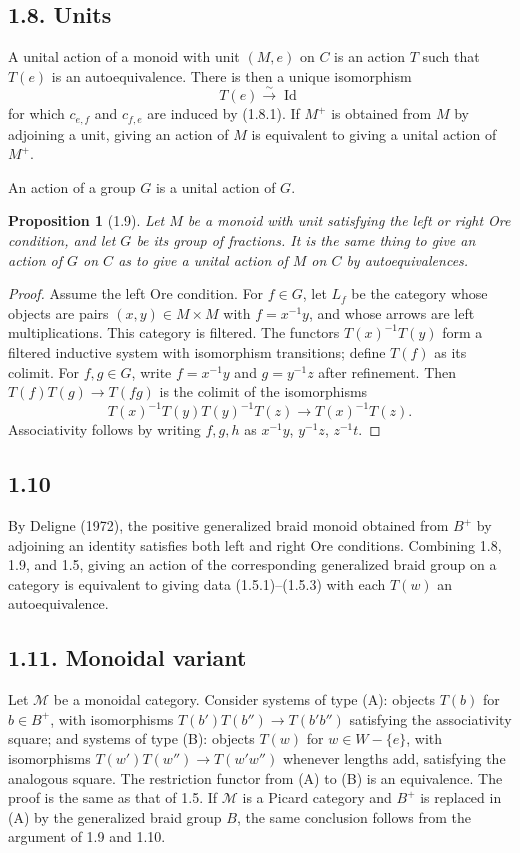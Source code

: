 \documentclass[11pt]{article}
\newtheorem{proposition}[theorem]{Proposition}
\newcommand{\Id}{\operatorname{Id}}
\begin{document}
\subsection*{1.8. Units}
A unital action of a monoid with unit $(M,e)$ on $C$ is an action $T$ such that $T(e)$ is an autoequivalence. There is then a unique isomorphism
\begin{equation}
T(e)\xrightarrow{\sim}\Id\tag{1.8.1}
\end{equation}
for which $c_{e,f}$ and $c_{f,e}$ are induced by (1.8.1). If $M^+$ is obtained from $M$ by adjoining a unit, giving an action of $M$ is equivalent to giving a unital action of $M^+$.

An action of a group $G$ is a unital action of $G$.

\begin{proposition}[1.9]
Let $M$ be a monoid with unit satisfying the left or right Ore condition, and let $G$ be its group of fractions. It is the same thing to give an action of $G$ on $C$ as to give a unital action of $M$ on $C$ by autoequivalences.
\end{proposition}
\begin{proof}
Assume the left Ore condition. For $f\in G$, let $L_f$ be the category whose objects are pairs $(x,y)\in M\times M$ with $f=x^{-1}y$, and whose arrows are left multiplications. This category is filtered. The functors $T(x)^{-1}T(y)$ form a filtered inductive system with isomorphism transitions; define $T(f)$ as its colimit. For $f,g\in G$, write $f=x^{-1}y$ and $g=y^{-1}z$ after refinement. Then $T(f)T(g)\to T(fg)$ is the colimit of the isomorphisms
\[
T(x)^{-1}T(y)T(y)^{-1}T(z)\longrightarrow T(x)^{-1}T(z).
\]
Associativity follows by writing $f,g,h$ as $x^{-1}y$, $y^{-1}z$, $z^{-1}t$.
\end{proof}

\subsection*{1.10}
By Deligne (1972), the positive generalized braid monoid obtained from $B^+$ by adjoining an identity satisfies both left and right Ore conditions. Combining 1.8, 1.9, and 1.5, giving an action of the corresponding generalized braid group on a category is equivalent to giving data (1.5.1)--(1.5.3) with each $T(w)$ an autoequivalence.

\subsection*{1.11. Monoidal variant}
Let $\mathcal M$ be a monoidal category. Consider systems of type (A): objects $T(b)$ for $b\in B^+$, with isomorphisms $T(b')T(b'')\to T(b'b'')$ satisfying the associativity square; and systems of type (B): objects $T(w)$ for $w\in W-\{e\}$, with isomorphisms $T(w')T(w'')\to T(w'w'')$ whenever lengths add, satisfying the analogous square. The restriction functor from (A) to (B) is an equivalence. The proof is the same as that of 1.5. If $\mathcal M$ is a Picard category and $B^+$ is replaced in (A) by the generalized braid group $B$, the same conclusion follows from the argument of 1.9 and 1.10.
\end{document}
